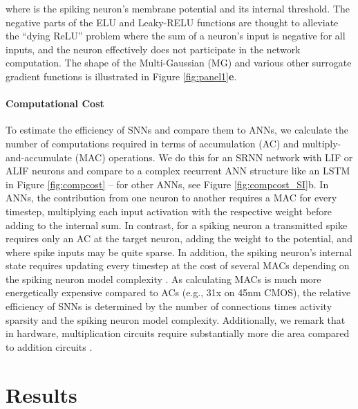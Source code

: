 \documentclass[fleqn,10pt]{wlscirep}
\begin{document}
where  is the spiking neuron's membrane potential and  its internal threshold. 
The negative parts of the ELU and Leaky-RELU functions are thought to alleviate the ``dying ReLU'' problem \cite{lu2019dying} where the sum of a neuron's input is negative for all inputs, and the neuron effectively does not participate in the network computation. The shape of the Multi-Gaussian (MG) and various other surrogate gradient functions is illustrated in Figure \ref{fig:panel1}\textbf{e}.  





\paragraph{Computational Cost} To estimate the efficiency of SNNs and compare them to ANNs, we calculate the number of computations required in terms of accumulation (AC) and multiply-and-accumulate (MAC) operations\cite{wong2020tinyspeech}. We do this for an SRNN network with LIF or ALIF neurons and compare to a complex recurrent ANN structure like an LSTM\cite{hochreiter1997long} in Figure \ref{fig:compcost} -- for other ANNs, see Figure \ref{fig:compcost_SI}b.
In ANNs, the contribution from one neuron to another requires a MAC for every timestep, multiplying each input activation with the respective weight before adding to the internal sum. In contrast, for a spiking neuron a transmitted spike requires only an AC at the target neuron, adding the weight to the potential, and where spike inputs may be quite sparse. In addition, the spiking neuron's internal state requires updating every timestep at the cost of several MACs depending on the spiking neuron model complexity \cite{roy2019towards}. As calculating MACs is much more energetically expensive compared to ACs (e.g., 31x on 45nm CMOS\cite{horowitz20141}), the relative efficiency of SNNs is determined by the number of connections times activity sparsity and the spiking neuron model complexity.  Additionally, we remark that in hardware, multiplication circuits require substantially more die area compared to addition circuits \cite{ludgate1982proposed}.  

\section*{Results}
\end{document}
